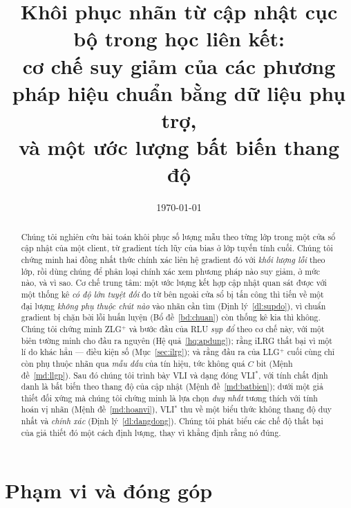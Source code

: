 \documentclass[11pt]{article}
\title{Khôi phục nhãn từ cập nhật cục bộ trong học liên kết:\\
cơ chế suy giảm của các phương pháp hiệu chuẩn bằng dữ liệu phụ trợ,\\
và một ước lượng bất biến thang độ}
\author{}
\date{\today}
\theoremstyle{remark}
\begin{document}
\maketitle

\begin{abstract}
Chúng tôi nghiên cứu bài toán khôi phục số lượng mẫu theo từng lớp trong một
cửa sổ cập nhật của một client, từ gradient tích lũy của bias ở lớp tuyến
tính cuối. Chúng tôi chứng minh hai đồng nhất thức chính xác liên hệ gradient
đó với \emph{khối lượng lỗi} theo lớp, rồi dùng chúng để phân loại chính xác
xem phương pháp nào suy giảm, ở mức nào, và vì sao. Cơ chế trung tâm: một ước
lượng kết hợp cập nhật quan sát được với một thống kê \emph{có độ lớn tuyệt
đối} đo từ bên ngoài cửa sổ bị tấn công thì tiến về một đại lượng
\emph{không phụ thuộc chút nào} vào nhãn cần tìm (Định lý~\ref{dl:supdo}), vì
chuẩn gradient bị chặn bởi lỗi huấn luyện (Bổ đề~\ref{bd:chuan}) còn thống kê
kia thì không. Chúng tôi chứng minh ZLG$^+$ và bước đầu của RLU \emph{sụp đổ}
theo cơ chế này, với một biên tường minh cho đầu ra nguyên
(Hệ quả~\ref{hq:apdung}); rằng iLRG thất bại vì một lí do khác hẳn --- điều
kiện số (Mục~\ref{sec:ilrg}); và rằng đầu ra của LLG$^+$ cuối cùng chỉ còn
phụ thuộc nhãn qua \emph{mẫu dấu} của tín hiệu, tức không quá $C$ bit
(Mệnh đề~\ref{md:llgp}).
Sau đó chúng tôi trình bày VLI và dạng đóng VLI$^*$, với tính chất định danh
là bất biến theo thang độ của cập nhật (Mệnh đề~\ref{md:batbien}); dưới một
giả thiết đối xứng mà chúng tôi chứng minh là lựa chọn \emph{duy nhất} tương
thích với tính hoán vị nhãn (Mệnh đề~\ref{md:hoanvi}), VLI$^*$ thu về một
biểu thức không thang độ duy nhất và \emph{chính xác}
(Định lý~\ref{dl:dangdong}). Chúng tôi phát biểu các chế độ thất bại của giả
thiết đó một cách định lượng, thay vì khẳng định rằng nó đúng.
\end{abstract}

\tableofcontents

\section{Phạm vi và đóng góp}
\end{document}
